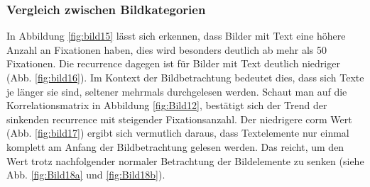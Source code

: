 \documentclass[
    language=german, %
    thesis=seminar, %
    supervisor=postdoc, %
    multiauthor=true, %
    ]{settings/csssa-thesis}
\begin{document}
\subsubsection{Vergleich zwischen Bildkategorien}
In Abbildung \ref{fig:bild15} lässt sich erkennen, dass Bilder mit Text eine höhere Anzahl an Fixationen haben, 
dies wird besonders deutlich ab mehr als 50 Fixationen. 
Die recurrence dagegen ist für Bilder mit Text deutlich niedriger (Abb. \ref{fig:bild16}). 
Im Kontext der Bildbetrachtung bedeutet dies, dass sich Texte je länger sie sind, 
seltener mehrmals durchgelesen werden.  Schaut man auf die Korrelationsmatrix in Abbildung \ref{fig:Bild12}, 
bestätigt sich der Trend der sinkenden recurrence mit steigender Fixationsanzahl. 
Der niedrigere corm Wert (Abb. \ref{fig:bild17}) ergibt sich vermutlich daraus, dass Textelemente 
nur einmal komplett am Anfang der Bildbetrachtung gelesen werden. Das reicht, 
um den Wert trotz nachfolgender normaler Betrachtung der Bildelemente zu senken (siehe Abb. \ref{fig:Bild18a} und \ref{fig:Bild18b}). 
\end{document}
